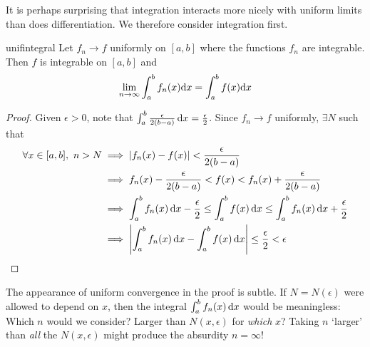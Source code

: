 It is perhaps surprising that integration interacts more nicely with uniform limits than does differentiation. We therefore consider integration first.

\begin{thm}{}{unifintegral}
	Let $f_n\to f$ uniformly on $[a,b]$ where the functions $f_n$ are integrable. Then $f$ is integrable on $[a,b]$ and
	\[
		\lim_{n\to\infty}\int_a^bf_n(x){\mathrm{d} x}=\int_a^bf(x){\mathrm{d} x}
	\]
\end{thm}

\begin{proof}
	Given $\epsilon>0$, note that $\int_a^b\frac\epsilon{2(b-a)}\,{\mathrm{d} x}=\frac\epsilon 2$. Since $f_n\to f$ uniformly, $\exists N$ such that\footnotemark
	\begin{align*}
		\forall x\in [a,b],\ n>N
		&\implies \left| f_n(x)-f(x)\right|<\frac\epsilon{2(b-a)}\\
		&\implies f_n(x)-\frac\epsilon{2(b-a)}<f(x)< f_n(x)+\frac\epsilon{2(b-a)}\\
		&\implies \int_a^b f_n(x)\,{\mathrm{d} x}-\frac\epsilon 2\le \int_a^bf(x)\,{\mathrm{d} x}
		\le \int_a^b f_n(x)\,{\mathrm{d} x}+\frac\epsilon 2\\
		&\implies \left| \int_a^bf_n(x)\,{\mathrm{d} x}-\int_a^bf(x)\,{\mathrm{d} x}\right|
		\le \frac\epsilon 2<\epsilon\tag*{\qedhere}
	\end{align*}
\end{proof}


The appearance of uniform convergence in the proof is subtle. If $N=N(\epsilon)$ were allowed to depend on $x$, then the integral $\int_a^bf_n(x)\,{\mathrm{d} x}$ would be meaningless: Which $n$ would we consider? Larger than $N(x,\epsilon)$ for \emph{which} $x$? Taking $n$ `larger' than \emph{all} the $N(x,\epsilon)$ might produce the absurdity $n=\infty$!

\goodbreak

